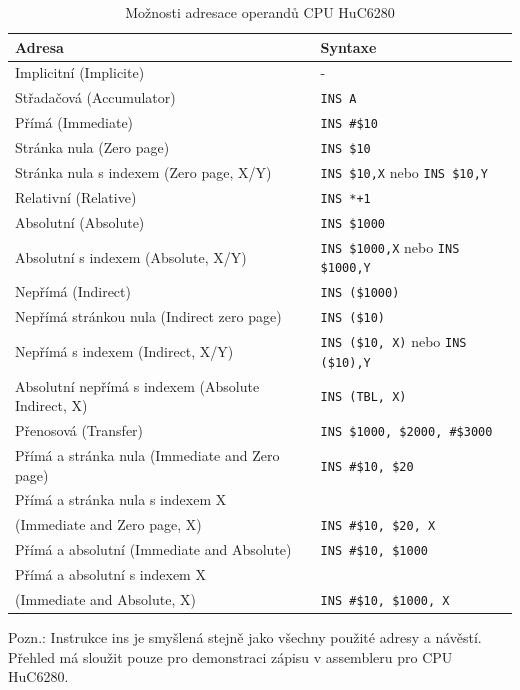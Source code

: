 \begin{table}[h!]
\begin{center}
\begin{tabular}{|l|l|}
\hline
\textbf{Adresa} & \textbf{Syntaxe} \\
\hline
Implicitní (Implicite) &
	- \\
Střadačová (Accumulator) & 
	{\tt INS A} \\
Přímá (Immediate) &
	{\tt INS \#\$10} \\
Stránka nula (Zero page) &
	{\tt INS \$10} \\
Stránka nula s indexem (Zero page, X/Y) &
	{\tt INS \$10,X} nebo {\tt INS \$10,Y} \\
Relativní (Relative) &
	{\tt INS *+1} \\
Absolutní (Absolute) &
	{\tt INS \$1000}  \\
Absolutní s indexem (Absolute, X/Y) &
	{\tt INS \$1000,X} nebo {\tt INS \$1000,Y} \\
Nepřímá (Indirect) &
	{\tt INS (\$1000)} \\
Nepřímá stránkou nula (Indirect zero page) &
	{\tt INS (\$10)} \\
Nepřímá s indexem (Indirect, X/Y) &
	{\tt INS (\$10, X)} nebo {\tt INS (\$10),Y} \\
Absolutní nepřímá s indexem (Absolute Indirect, X) &
	{\tt INS (TBL, X)} \\
\hline
Přenosová (Transfer) &
	{\tt INS \$1000, \$2000, \#\$3000} \\
Přímá a stránka nula (Immediate and Zero page) &
	{\tt INS \#\$10, \$20} \\
Přímá a stránka nula s indexem X & \\
	\hspace{0.5cm}(Immediate and Zero page, X) &
	{\tt INS \#\$10, \$20, X} \\
Přímá a absolutní (Immediate and Absolute) &
	{\tt INS \#\$10, \$1000} \\
Přímá a absolutní s indexem X & \\
	\hspace{0.5cm}(Immediate and Absolute, X) &
	{\tt INS \#\$10, \$1000, X} \\
\hline
\end{tabular}
\end{center}
Pozn.: Instrukce {\sc ins} je smyšlená stejně jako všechny použité adresy a
návěstí. Přehled má sloužit pouze pro demonstraci zápisu v assembleru pro
CPU HuC6280.
\caption{Možnosti adresace operandů CPU HuC6280\label{tab:cpu_addrmodes}}
\end{table}


